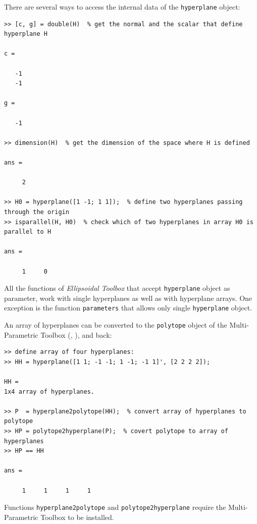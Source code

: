 \documentclass{report}
\begin{document}
There are several ways to access the internal data of the {\tt hyperplane}
object:
{\tt \begin{verbatim}
>> [c, g] = double(H)  % get the normal and the scalar that define hyperplane H

c =

   -1
   -1

g =

   -1

>> dimension(H)  % get the dimension of the space where H is defined

ans =

     2

>> H0 = hyperplane([1 -1; 1 1]);  % define two hyperplanes passing through the origin
>> isparallel(H, H0)  % check which of two hyperplanes in array H0 is parallel to H

ans =

     1     0
\end{verbatim} }
All the functions of {\it Ellipsoidal Toolbox} that accept {\tt hyperplane}
object as parameter, work with single hyperplanes as well as with hyperplane
arrays. One exception is the function {\tt parameters} that allows only
single {\tt hyperplane} object.

An array of hyperplanes can be converted to the {\tt polytope} object of the
Multi-Parametric Toolbox (\cite{morari}, \cite{mpt}), and back:
{\tt \begin{verbatim}
>> define array of four hyperplanes:
>> HH = hyperplane([1 1; -1 -1; 1 -1; -1 1]', [2 2 2 2]);

HH =
1x4 array of hyperplanes.

>> P  = hyperplane2polytope(HH);  % convert array of hyperplanes to polytope
>> HP = polytope2hyperplane(P);  % covert polytope to array of hyperplanes
>> HP == HH

ans =

     1     1     1     1
\end{verbatim} }
Functions {\tt hyperplane2polytope} and {\tt polytope2hyperplane} require
the Multi-Parametric Toolbox to be installed.
\end{document}
